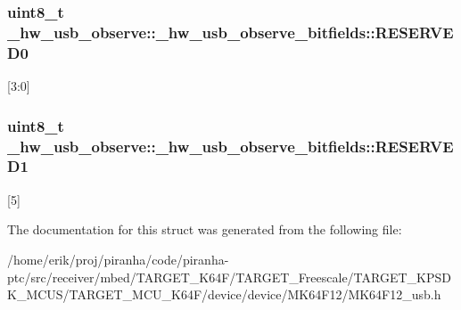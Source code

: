\subsubsection[{\texorpdfstring{R\+E\+S\+E\+R\+V\+E\+D0}{RESERVED0}}]{\setlength{\rightskip}{0pt plus 5cm}uint8\+\_\+t \+\_\+hw\+\_\+usb\+\_\+observe\+::\+\_\+hw\+\_\+usb\+\_\+observe\+\_\+bitfields\+::\+R\+E\+S\+E\+R\+V\+E\+D0}\hypertarget{struct__hw__usb__observe_1_1__hw__usb__observe__bitfields_abbec1232da1b1dbbb0c1382f87d8e646}{}\label{struct__hw__usb__observe_1_1__hw__usb__observe__bitfields_abbec1232da1b1dbbb0c1382f87d8e646}
\mbox{[}3\+:0\mbox{]} 
\subsubsection[{\texorpdfstring{R\+E\+S\+E\+R\+V\+E\+D1}{RESERVED1}}]{\setlength{\rightskip}{0pt plus 5cm}uint8\+\_\+t \+\_\+hw\+\_\+usb\+\_\+observe\+::\+\_\+hw\+\_\+usb\+\_\+observe\+\_\+bitfields\+::\+R\+E\+S\+E\+R\+V\+E\+D1}\hypertarget{struct__hw__usb__observe_1_1__hw__usb__observe__bitfields_a5828c43245d449a0a4bc5fde4a4d3cbb}{}\label{struct__hw__usb__observe_1_1__hw__usb__observe__bitfields_a5828c43245d449a0a4bc5fde4a4d3cbb}
\mbox{[}5\mbox{]} 

The documentation for this struct was generated from the following file\+:\begin{DoxyCompactItemize}
\item 
/home/erik/proj/piranha/code/piranha-\/ptc/src/receiver/mbed/\+T\+A\+R\+G\+E\+T\+\_\+\+K64\+F/\+T\+A\+R\+G\+E\+T\+\_\+\+Freescale/\+T\+A\+R\+G\+E\+T\+\_\+\+K\+P\+S\+D\+K\+\_\+\+M\+C\+U\+S/\+T\+A\+R\+G\+E\+T\+\_\+\+M\+C\+U\+\_\+\+K64\+F/device/device/\+M\+K64\+F12/M\+K64\+F12\+\_\+usb.\+h\end{DoxyCompactItemize}
